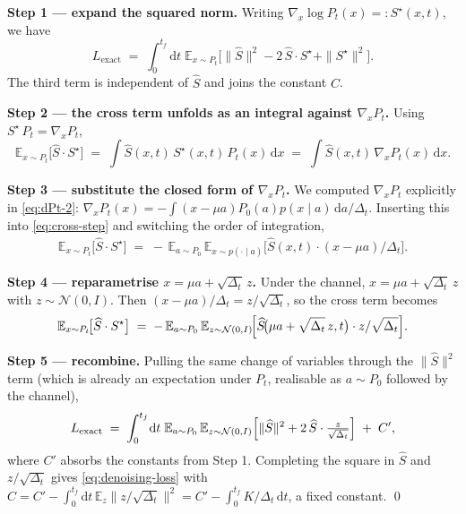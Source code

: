 \documentclass[11pt]{article}
\theoremstyle{definition}
\newcommand{\E}{\mathbb{E}}
\newcommand{\Detl}{\Delta_t}
\begin{document}
\begin{derivation}
\textbf{Step 1 --- expand the squared norm.} Writing
\(\nabla_x \log P_t(x) =: S^\star(x, t)\), we have
\begin{equation}
    L_{\mathrm{exact}}
    \;=\;
    \int_0^{t_f}\!\mathrm d t\;
    \E_{x \sim P_t}\bigl[
        \|\widehat S\|^2
        - 2\, \widehat S \cdot S^\star
        + \|S^\star\|^2
    \bigr].
\end{equation}
The third term is independent of \(\widehat S\) and joins the
constant \(C\).

\textbf{Step 2 --- the cross term unfolds as an integral against
\(\nabla_x P_t\).} Using \(S^\star\, P_t = \nabla_x P_t\),
\begin{equation}\label{eq:cross-step}
    \E_{x \sim P_t}\!\bigl[\widehat S \cdot S^\star\bigr]
    \;=\; \int \widehat S(x, t)\, S^\star(x, t)\, P_t(x)\, \mathrm d x
    \;=\; \int \widehat S(x, t)\, \nabla_x P_t(x)\, \mathrm d x.
\end{equation}

\textbf{Step 3 --- substitute the closed form of \(\nabla_x P_t\).}
We computed \(\nabla_x P_t\) explicitly in \eqref{eq:dPt-2}:
\(\nabla_x P_t(x) = - \int (x - \mu a) P_0(a) p(x \mid a)\, \mathrm d
a / \Detl\). Inserting this into \eqref{eq:cross-step} and switching
the order of integration,
\begin{align}
    \E_{x \sim P_t}\!\bigl[\widehat S \cdot S^\star\bigr]
    \;=\;
    -\,\E_{a \sim P_0}\, \E_{x \sim p(\cdot \mid a)}
        \!\bigl[\widehat S(x, t) \cdot (x - \mu a) / \Detl\bigr].
\end{align}

\textbf{Step 4 --- reparametrise \(x = \mu a + \sqrt{\Detl}\, z\).}
Under the channel, \(x = \mu a + \sqrt{\Detl}\, z\) with
\(z \sim \mathcal N(0, I)\). Then \((x - \mu a) / \Detl = z /
\sqrt{\Detl}\), so the cross term becomes
\begin{equation}
    \E_{x \sim P_t}\!\bigl[\widehat S \cdot S^\star\bigr]
    \;=\;
    -\,\E_{a \sim P_0}\, \E_{z \sim \mathcal N(0, I)}
        \!\Bigl[\widehat S\!\bigl(\mu a + \sqrt{\Detl}\, z, t\bigr)
                \cdot z / \sqrt{\Detl}\Bigr].
\end{equation}

\textbf{Step 5 --- recombine.} Pulling the same change of variables
through the \(\|\widehat S\|^2\) term (which is already an expectation
under \(P_t\), realisable as \(a \sim P_0\) followed by the channel),
\begin{equation}
    L_{\mathrm{exact}}
    \;=\;
    \int_0^{t_f}\!\mathrm d t\;
    \E_{a \sim P_0}\, \E_{z \sim \mathcal N(0, I)}
        \Bigl[
            \|\widehat S\|^2
            + 2\, \widehat S \cdot \tfrac{z}{\sqrt{\Detl}}
        \Bigr]
    \;+\; C',
\end{equation}
where \(C'\) absorbs the constants from Step 1. Completing the
square in \(\widehat S\) and \(z / \sqrt{\Detl}\) gives
\eqref{eq:denoising-loss} with
\(C = C' - \int_0^{t_f} \mathrm d t\, \E_z\|z / \sqrt{\Detl}\|^2
= C' - \int_0^{t_f} K / \Detl\, \mathrm d t\), a fixed constant. \qed
\end{derivation}
\end{document}
